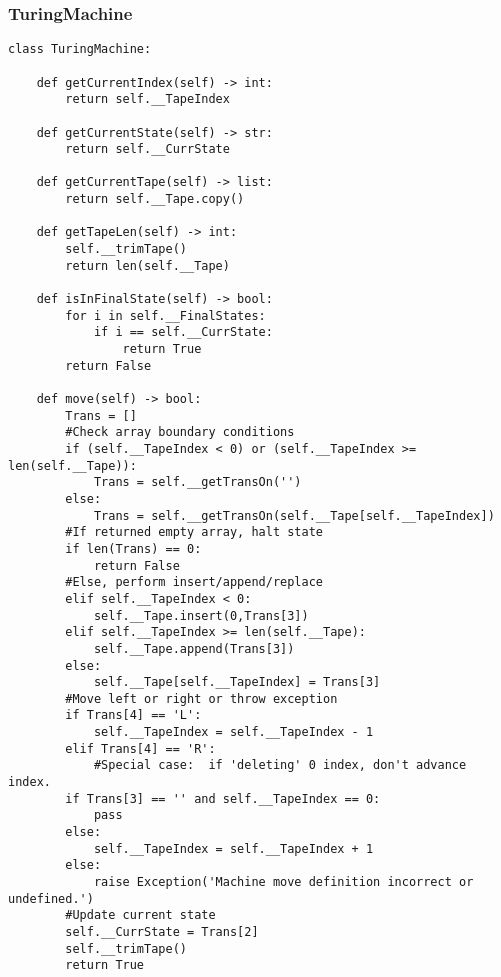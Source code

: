 \documentclass[12pt]{article}
\begin{document}
\subsubsection{TuringMachine}
\begin{lstlisting}
class TuringMachine:
    
    def getCurrentIndex(self) -> int:
        return self.__TapeIndex

    def getCurrentState(self) -> str:
        return self.__CurrState

    def getCurrentTape(self) -> list:
        return self.__Tape.copy()

    def getTapeLen(self) -> int:
        self.__trimTape()
        return len(self.__Tape)

    def isInFinalState(self) -> bool:
        for i in self.__FinalStates:
            if i == self.__CurrState:
                return True
        return False

    def move(self) -> bool:
        Trans = []
        #Check array boundary conditions
        if (self.__TapeIndex < 0) or (self.__TapeIndex >= len(self.__Tape)):
            Trans = self.__getTransOn('')
        else:
            Trans = self.__getTransOn(self.__Tape[self.__TapeIndex])
        #If returned empty array, halt state
        if len(Trans) == 0:
            return False
        #Else, perform insert/append/replace
        elif self.__TapeIndex < 0:
            self.__Tape.insert(0,Trans[3])
        elif self.__TapeIndex >= len(self.__Tape):
            self.__Tape.append(Trans[3])
        else:
            self.__Tape[self.__TapeIndex] = Trans[3]
        #Move left or right or throw exception
        if Trans[4] == 'L':
            self.__TapeIndex = self.__TapeIndex - 1
        elif Trans[4] == 'R':
            #Special case:  if 'deleting' 0 index, don't advance index.
        if Trans[3] == '' and self.__TapeIndex == 0:
            pass
        else:
            self.__TapeIndex = self.__TapeIndex + 1
        else:
            raise Exception('Machine move definition incorrect or undefined.')
        #Update current state
        self.__CurrState = Trans[2]
        self.__trimTape()
        return True
\end{lstlisting}
\end{document}
